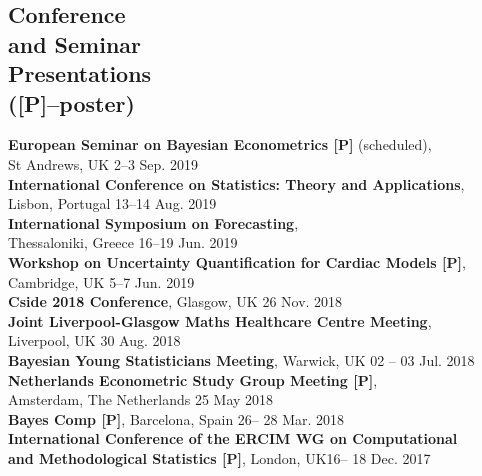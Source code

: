 \documentclass[margin,line]{resume}
\begin{document}
\begin{resume}
\section{\mysidestyle Conference \\and Seminar \\Presentations \\ ([P]--poster)} 
	\textbf{ European Seminar on Bayesian Econometrics [P]} (scheduled),\\
	St Andrews, UK \hfill 2--3 Sep. 2019 \vspace{1mm} \\
	\textbf{International Conference on Statistics: Theory and Applications},\\
	Lisbon, Portugal \hfill 13--14 Aug. 2019 \vspace{1mm} \\		
	\textbf{ International Symposium on Forecasting},\\
	Thessaloniki, Greece \hfill 16--19 Jun. 2019 \vspace{1mm} \\	
	\textbf{Workshop on Uncertainty Quantification for Cardiac Models [P]},\\
	Cambridge, UK \hfill 5--7 Jun. 2019 \vspace{1mm} \\		
	\textbf{Cside 2018 Conference}, Glasgow, UK \hfill 26 Nov. 2018 \vspace{1mm} \\
	\textbf{ Joint Liverpool-Glasgow Maths Healthcare Centre Meeting},\\
	Liverpool, UK \hfill 30 Aug. 2018 \vspace{1mm} \\	
	\textbf{ Bayesian Young Statisticians Meeting}, Warwick, UK \hfill 02 -- 03 Jul. 2018 \vspace{1mm} \\
	\textbf{ Netherlands Econometric Study Group Meeting [P]}, \\
	Amsterdam, The Netherlands \hfill 25 May 2018  \vspace{1mm} \\ 
	\textbf{ Bayes Comp [P]}, Barcelona, Spain \hfill 26-- 28 Mar. 2018 \vspace{1mm} \\
	\textbf{ International Conference of the ERCIM WG on Computational}\\
	\textbf{and Methodological Statistics [P]}, London, UK\hfill 16-- 18 Dec. 2017 \vspace{1mm} \\ 	

\end{resume}
\end{document}

